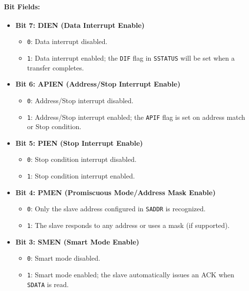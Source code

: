 \paragraph{Bit Fields:}
\begin{itemize}[leftmargin=*,itemsep=2mm]
  \item \textbf{Bit 7: DIEN (Data Interrupt Enable)}  
        \begin{itemize}
          \item \texttt{0}: Data interrupt disabled.
          \item \texttt{1}: Data interrupt enabled; the \texttt{DIF} flag in \texttt{SSTATUS} will be set when a transfer completes.
        \end{itemize}
  \item \textbf{Bit 6: APIEN (Address/Stop Interrupt Enable)}  
        \begin{itemize}
          \item \texttt{0}: Address/Stop interrupt disabled.
          \item \texttt{1}: Address/Stop interrupt enabled; the \texttt{APIF} flag is set on address match or Stop condition.
        \end{itemize}
  \item \textbf{Bit 5: PIEN (Stop Interrupt Enable)}  
        \begin{itemize}
          \item \texttt{0}: Stop condition interrupt disabled.
          \item \texttt{1}: Stop condition interrupt enabled.
        \end{itemize}
  \item \textbf{Bit 4: PMEN (Promiscuous Mode/Address Mask Enable)}  
        \begin{itemize}
          \item \texttt{0}: Only the slave address configured in \texttt{SADDR} is recognized.
          \item \texttt{1}: The slave responds to any address or uses a mask (if supported).
        \end{itemize}
  \item \textbf{Bit 3: SMEN (Smart Mode Enable)}  
        \begin{itemize}
          \item \texttt{0}: Smart mode disabled.
          \item \texttt{1}: Smart mode enabled; the slave automatically issues an ACK when \texttt{SDATA} is read.
        \end{itemize}

\end{itemize}
